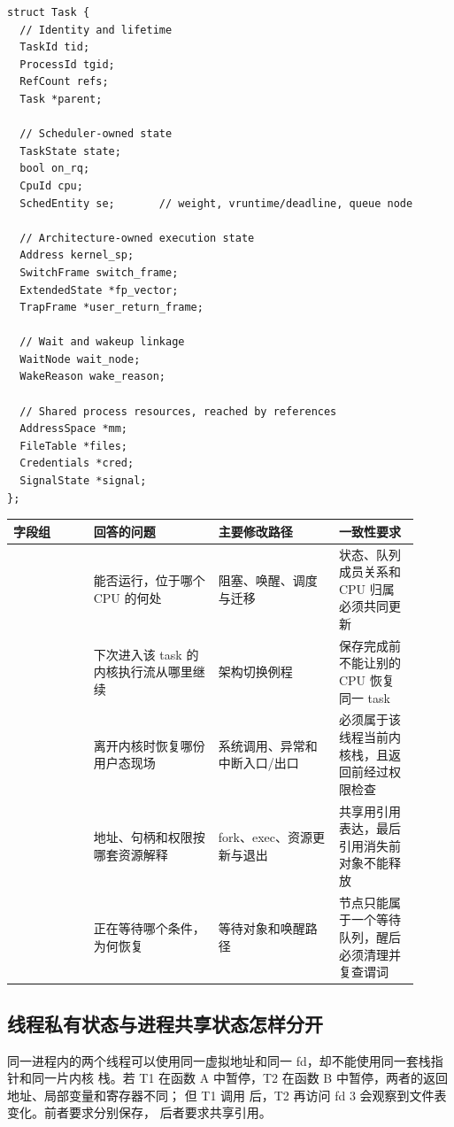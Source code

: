 \begin{lstlisting}
struct Task {
  // Identity and lifetime
  TaskId tid;
  ProcessId tgid;
  RefCount refs;
  Task *parent;

  // Scheduler-owned state
  TaskState state;
  bool on_rq;
  CpuId cpu;
  SchedEntity se;       // weight, vruntime/deadline, queue node

  // Architecture-owned execution state
  Address kernel_sp;
  SwitchFrame switch_frame;
  ExtendedState *fp_vector;
  TrapFrame *user_return_frame;

  // Wait and wakeup linkage
  WaitNode wait_node;
  WakeReason wake_reason;

  // Shared process resources, reached by references
  AddressSpace *mm;
  FileTable *files;
  Credentials *cred;
  SignalState *signal;
};
\end{lstlisting}

\begin{longtable}{|L{0.18\linewidth}|L{0.28\linewidth}|L{0.27\linewidth}|L{0.18\linewidth}|}
\hline
字段组 & 回答的问题 & 主要修改路径 & 一致性要求 \\ \hline
{} & 能否运行，位于哪个 CPU 的何处 & 阻塞、唤醒、调度与迁移 & 状态、队列成员关系和 CPU 归属必须共同更新 \\ \hline
{} & 下次进入该 task 的内核执行流从哪里继续 & 架构切换例程 & 保存完成前不能让别的 CPU 恢复同一 task \\ \hline
{} & 离开内核时恢复哪份用户态现场 & 系统调用、异常和中断入口/出口 & 必须属于该线程当前内核栈，且返回前经过权限检查 \\ \hline
{} & 地址、句柄和权限按哪套资源解释 & fork、exec、资源更新与退出 & 共享用引用表达，最后引用消失前对象不能释放 \\ \hline
{} & 正在等待哪个条件，为何恢复 & 等待对象和唤醒路径 & 节点只能属于一个等待队列，醒后必须清理并复查谓词 \\ \hline
\end{longtable}

\subsection{线程私有状态与进程共享状态怎样分开}

同一进程内的两个线程可以使用同一虚拟地址和同一 fd，却不能使用同一套栈指针和同一片内核
栈。若 T1 在函数 A 中暂停，T2 在函数 B 中暂停，两者的返回地址、局部变量和寄存器不同；
但 T1 调用  后，T2 再访问 fd 3 会观察到文件表变化。前者要求分别保存，
后者要求共享引用。

